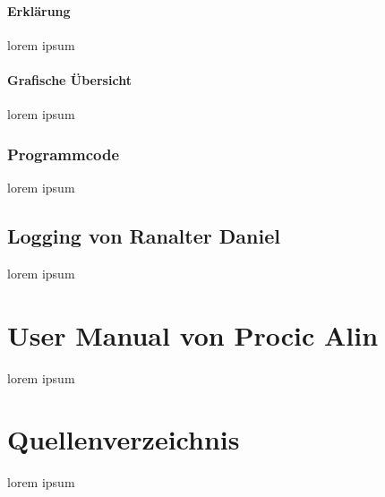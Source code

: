 \documentclass[10pt,a4paper]{report}
\begin{document}
\subsubsection{Erklärung}
lorem ipsum
\subsubsection{Grafische Übersicht}
lorem ipsum
\subsection{Programmcode}
lorem ipsum
\section{Logging von Ranalter Daniel}
lorem ipsum
\chapter{User Manual von Procic Alin}
lorem ipsum 
\chapter{Quellenverzeichnis}
lorem ipsum 
\end{document}
